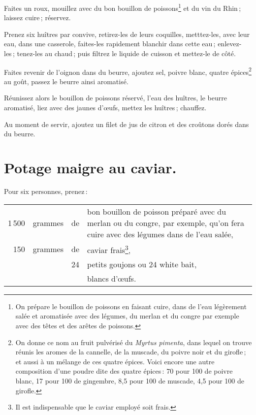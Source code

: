 Faites un roux, mouillez avec du bon bouillon de
poissons\footnote{\label{pg0218} \hypertarget{p0218}{On prépare le bouillon de poissons} en
faisant cuire, dans de l'eau légèrement salée et aromatisée avec des légumes,
du merlan et du congre par exemple avec des têtes et des arêtes de poissons.}
et du vin du Rhin ; laissez cuire ; réservez.

Prenez six huîtres par convive, retirez-les de leurs coquilles, metttez-les,
avec leur eau, dans une casserole, faites-les rapidement blanchir dans cette
eau ; enlevez-les ; tenez-les au chaud ; puis filtrez le liquide de cuisson et
mettez-le de côté.

Faites revenir de l'oignon dans du beurre, ajoutez sel, poivre blanc, quatre
épices\footnote{On donne ce nom au fruit pulvérisé du \textit{Myrtus pimenta},
dans lequel on trouve réunis les aromes de la cannelle, de la muscade, du
poivre noir et du girofle ; et aussi à un mélange de ces quatre épices. Voici
encore une autre composition d'une poudre dite des quatre épices : 70 pour 100
de poivre blanc, 17 pour 100 de gingembre, 8,5 pour 100 de muscade, 4,5 pour
100 de girofle.} au goût, passez le beurre ainsi aromatisé.

Réunissez alors le bouillon de poissons réservé, l’eau des huîtres, le beurre
aromatisé, liez avec des jaunes d'œufs, mettez les huîtres ; chauffez.

Au moment de servir, ajoutez un filet de jus de citron et des croûtons dorés
dans du beurre.

\section*{\centering Potage maigre au caviar.}

\medskip

Pour six personnes, prenez :

\medskip

\footnotesize
\begin{longtable}{rrrp{16em}}                                                    
  1 500 &  grammes & de  &  bon bouillon de poisson préparé avec du merlan ou du                 
                            congre, par exemple, qu'on fera cuire avec des légumes               
                            dans de l'eau salée,                                                          \\
    150 &  grammes & de  &  caviar frais\footnote{Il est indispensable que le caviar 
                            employé soit frais.},                                                         \\
        &          &  24 &  petits goujons ou 24 white bait,                                              \\
        &          &     &  blancs d'œufs.                                                                \\
\end{longtable}
\normalsize

